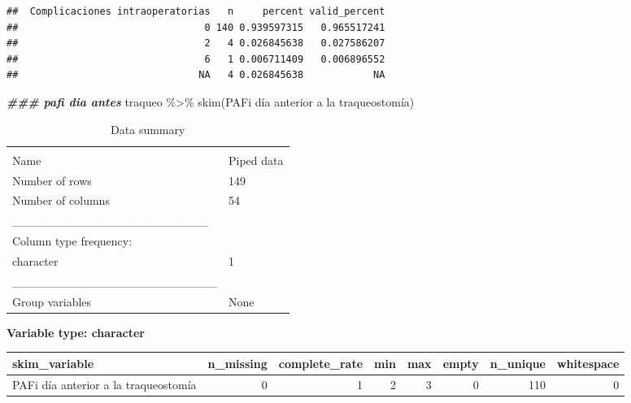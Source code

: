 \documentclass[
]{article}
\newenvironment{Shaded}{\begin{snugshade}}{\end{snugshade}}
\newcommand{\AttributeTok}[1]{\textcolor[rgb]{0.77,0.63,0.00}{#1}}
\newcommand{\DocumentationTok}[1]{\textcolor[rgb]{0.56,0.35,0.01}{\textbf{\textit{#1}}}}
\newcommand{\FunctionTok}[1]{\textcolor[rgb]{0.00,0.00,0.00}{#1}}
\newcommand{\NormalTok}[1]{#1}
\newcommand{\OtherTok}[1]{\textcolor[rgb]{0.56,0.35,0.01}{#1}}
\newcommand{\SpecialCharTok}[1]{\textcolor[rgb]{0.00,0.00,0.00}{#1}}
\newcommand{\StringTok}[1]{\textcolor[rgb]{0.31,0.60,0.02}{#1}}
\begin{document}
\begin{verbatim}
##  Complicaciones intraoperatorias   n     percent valid_percent
##                                0 140 0.939597315   0.965517241
##                                2   4 0.026845638   0.027586207
##                                6   1 0.006711409   0.006896552
##                               NA   4 0.026845638            NA
\end{verbatim}

\begin{Shaded}
\begin{Highlighting}[]
\DocumentationTok{\#\#\# pafi dia antes}
\NormalTok{traqueo }\SpecialCharTok{\%\textgreater{}\%}
  \FunctionTok{skim}\NormalTok{(}\StringTok{\textasciigrave{}}\AttributeTok{PAFi día anterior a la traqueostomía}\StringTok{\textasciigrave{}}\NormalTok{)}
\end{Highlighting}
\end{Shaded}

\begin{longtable}[]{@{}ll@{}}
\caption{Data summary}\tabularnewline
\toprule
& \\
\midrule
\endfirsthead
\toprule
& \\
\midrule
\endhead
Name & Piped data \\
Number of rows & 149 \\
Number of columns & 54 \\
\_\_\_\_\_\_\_\_\_\_\_\_\_\_\_\_\_\_\_\_\_\_\_ & \\
Column type frequency: & \\
character & 1 \\
\_\_\_\_\_\_\_\_\_\_\_\_\_\_\_\_\_\_\_\_\_\_\_\_ & \\
Group variables & None \\
\bottomrule
\end{longtable}

\textbf{Variable type: character}

\begin{longtable}[]{@{}lrrrrrrr@{}}
\toprule
skim\_variable & n\_missing & complete\_rate & min & max & empty &
n\_unique & whitespace \\
\midrule
\endhead
PAFi día anterior a la traqueostomía & 0 & 1 & 2 & 3 & 0 & 110 & 0 \\
\bottomrule
\end{longtable}

\begin{Shaded}
\end{Shaded}
\end{document}

